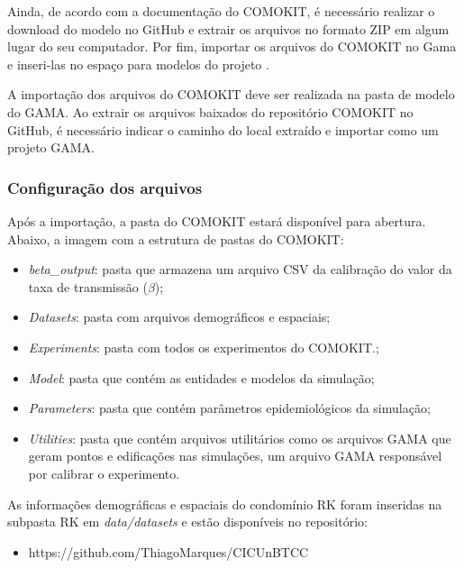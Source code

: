 Ainda, de acordo com a documentação do COMOKIT, é necessário realizar o download do modelo no GitHub e extrair os arquivos no formato ZIP em algum lugar do seu computador. Por fim, importar os arquivos do COMOKIT no Gama e inseri-las no espaço para modelos do projeto \cite{ComokitDoc}.



A importação dos arquivos do COMOKIT deve ser realizada na pasta de modelo do GAMA. Ao extrair os arquivos baixados do repositório COMOKIT no GitHub, é necessário indicar o caminho do local extraído e importar como um projeto GAMA.

\subsubsection{Configuração dos arquivos}

Após a importação, a pasta do COMOKIT estará disponível para abertura. Abaixo, a imagem com a estrutura de pastas do COMOKIT:

\begin{itemize}
\item \textit{beta\_output}: pasta que armazena um arquivo CSV da calibração do valor da taxa de transmissão ($\beta$);
\item \textit{Datasets}: pasta com arquivos demográficos e espaciais;
\item \textit{Experiments}: pasta com todos os experimentos do COMOKIT.;
\item \textit{Model}: pasta que contém as entidades e modelos da simulação;
\item \textit{Parameters}: pasta que contém parâmetros epidemiológicos da simulação;
\item \textit{Utilities}: pasta que contém arquivos utilitários como os arquivos GAMA que geram pontos e edificações nas simulações, um arquivo GAMA responsável por calibrar o experimento.
\end{itemize}

As informações demográficas e espaciais do condomínio RK foram inseridas na subpasta RK em \textit{data/datasets} e estão disponíveis no repositório:
\begin{itemize}
\item https://github.com/ThiagoMarques/CICUnBTCC
\end{itemize}

